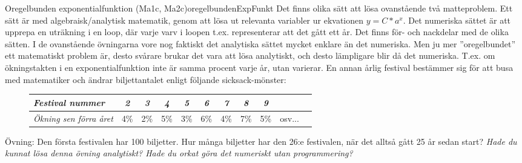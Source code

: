 \newpage
\begin{matteovningm}{Oregelbunden exponentialfunktion (Ma1c, Ma2c)}{oregelbundenExpFunkt}
Det finns olika sätt att lösa ovanstående två matteproblem. Ett sätt är med algebraisk/analytisk matematik, genom att lösa ut relevanta variabler ur ekvationen $y=C*a^x$. Det numeriska sättet är att upprepa en uträkning i en loop, där varje varv i loopen t.ex. representerar att det gått ett år.
\newline
\newline
Det finns för- och nackdelar med de olika sätten. I de ovanstående övningarna vore nog faktiskt det analytiska sättet mycket enklare än det numeriska. Men ju mer ''oregelbundet'' ett matematiskt problem är, desto svårare brukar det vara att lösa analytiskt, och desto lämpligare blir då det numeriska. T.ex. om ökningstakten i en exponentialfunktion inte är samma procent varje år, utan varierar.
\newline
\newline
En annan årlig festival bestämmer sig för att busa med matematiker och ändrar biljettantalet enligt följande sicksack-mönster:

\begin{figure}[H]
\begin{center}
\begin{tabular}{l|*{9}{c}r}
\emph{Festival nummer} & \emph{2} & \emph{3} & \emph{4} & \emph{5} & \emph{6} & \emph{7} & \emph{8} & \emph{9} & \\
\hline
\emph{Ökning sen förra året}       & 4\% & 2\% & 5\% & 3\% & 6\% & 4\% & 7\% & 5\% & osv...  \\
\end{tabular}
\end{center}
\end{figure}

Övning: Den första festivalen har 100 biljetter. Hur många biljetter har den 26:e festivalen, när det alltså gått 25 år sedan start?
\newline
\newline
\emph{Hade du kunnat lösa denna övning analytiskt? Hade du orkat göra det numeriskt utan programmering?}
\end{matteovningm}

\newpage

